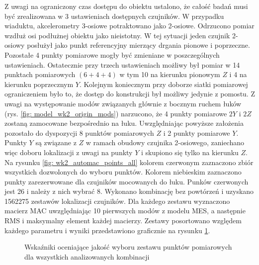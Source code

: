 Z uwagi na ograniczony czas dostępu do obiektu ustalono, że całość badań musi być zrealizowana w 3 ustawieniach dostępnych czujników. W przypadku wiaduktu, akcelerometry 3-osiowe potraktowano jako 2-osiowe. Odrzucono pomiar wzdłuż osi podłużnej obiektu jako nieistotny. W tej sytuacji jeden czujnik 2-osiowy posłużył jako punkt referencyjny mierzący drgania pionowe i poprzeczne. Pozostałe 4 punkty pomiarowe mogły być zmieniane w poszczególnych ustawieniach. Ostatecznie przy trzech ustawieniach możliwy był pomiar w 14 punktach pomiarowych $(6+4+4)$ w tym 10 na kierunku pionowym $Z$ i 4 na kierunku poprzecznym $Y$. Kolejnym koniecznym przy doborze siatki pomiarowej ograniczeniem było to, że dostęp do konstrukcji był możliwy jedynie z pomostu. Z uwagi na występowanie modów związanych głównie z bocznym ruchem łuków (rys. \ref{fig: model_wk2_origin_mods}) narzucono, że 4 punkty pomiarowe $2Y$ i $2Z$ zostaną zamocowane bezpośrednio na łuku. Uwzględniając powyższe założenia pozostało do dyspozycji 8 punktów pomiarowych $Z$ i 2 punkty pomiarowe $Y$. Punkty $Y$ są związane z $Z$ w ramach obudowy czujnika 2-osiowego, zaniechano więc doboru lokalizacji z uwagi na punkty $Y$ i skupiono się tylko na kierunku $Z$. Na rysunku \ref{fig: wk2_automac_points_all} kolorem czerwonym zaznaczono zbiór wszystkich dozwolonych do wyboru punktów. Kolorem niebieskim zaznaczono punkty zarezerwowane dla czujników mocowanych do łuku. Punków czerwonych jest 26 i należy z nich wybrać 8. Wykonano kombinację bez powtórzeń i uzyskano 1562275 zestawów lokalizacji czujników. Dla każdego zestawu wyznaczono macierz MAC uwzględniając 10 pierwszych modów z modelu MES, a następnie RMS i maksymalny element każdej macierzy. Zestawy posortowano względem każdego parametru i wyniki przedstawiono graficznie na rysunku \ref{fig: wk2_automac_charts}. 
\begin{figure}[t]
	\centering
	\captionsetup{justification=centering}
	\captionsetup{justification=centering}
	\caption{Wskaźniki oceniające jakość wyboru zestawu punktów pomiarowych dla wszystkich analizowanych kombinacji}
	\label{fig: wk2_automac_charts}
\end{figure}
